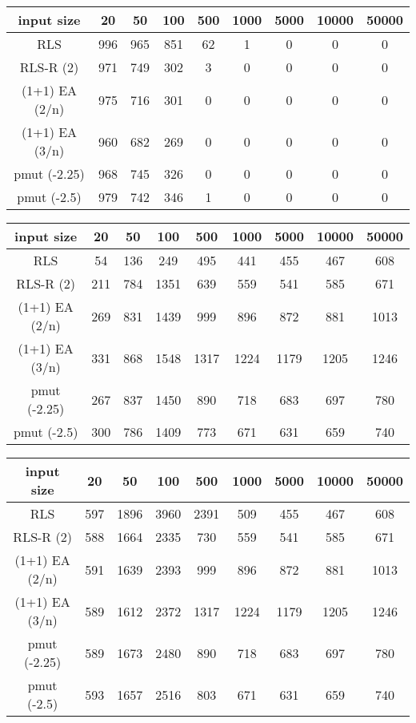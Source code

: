 \begin{tabular}[h]{ccccccccc}
      input size     & 20  & 50  & 100 & 500 & 1000 & 5000 & 10000 & 50000 \\\hline
      RLS            & 996 & 965 & 851 & 62  & 1    & 0    & 0     & 0     \\
      RLS-R (2)      & 971 & 749 & 302 & 3   & 0    & 0    & 0     & 0     \\
      (1+1) EA (2/n) & 975 & 716 & 301 & 0   & 0    & 0    & 0     & 0     \\
      (1+1) EA (3/n) & 960 & 682 & 269 & 0   & 0    & 0    & 0     & 0     \\
      pmut (-2.25)   & 968 & 745 & 326 & 0   & 0    & 0    & 0     & 0     \\
      pmut (-2.5)    & 979 & 742 & 346 & 1   & 0    & 0    & 0     & 0     \\
\end{tabular}

\begin{tabular}[h]{ccccccccc}
      input size     & 20  & 50  & 100  & 500  & 1000 & 5000 & 10000 & 50000 \\\hline
      RLS            & 54  & 136 & 249  & 495  & 441  & 455  & 467   & 608   \\
      RLS-R (2)      & 211 & 784 & 1351 & 639  & 559  & 541  & 585   & 671   \\
      (1+1) EA (2/n) & 269 & 831 & 1439 & 999  & 896  & 872  & 881   & 1013  \\
      (1+1) EA (3/n) & 331 & 868 & 1548 & 1317 & 1224 & 1179 & 1205  & 1246  \\
      pmut (-2.25)   & 267 & 837 & 1450 & 890  & 718  & 683  & 697   & 780   \\
      pmut (-2.5)    & 300 & 786 & 1409 & 773  & 671  & 631  & 659   & 740   \\
\end{tabular}

\begin{tabular}[h]{ccccccccc}
      input size     & 20  & 50   & 100  & 500  & 1000 & 5000 & 10000 & 50000 \\\hline
      RLS            & 597 & 1896 & 3960 & 2391 & 509  & 455  & 467   & 608   \\
      RLS-R (2)      & 588 & 1664 & 2335 & 730  & 559  & 541  & 585   & 671   \\
      (1+1) EA (2/n) & 591 & 1639 & 2393 & 999  & 896  & 872  & 881   & 1013  \\
      (1+1) EA (3/n) & 589 & 1612 & 2372 & 1317 & 1224 & 1179 & 1205  & 1246  \\
      pmut (-2.25)   & 589 & 1673 & 2480 & 890  & 718  & 683  & 697   & 780   \\
      pmut (-2.5)    & 593 & 1657 & 2516 & 803  & 671  & 631  & 659   & 740   \\
\end{tabular}